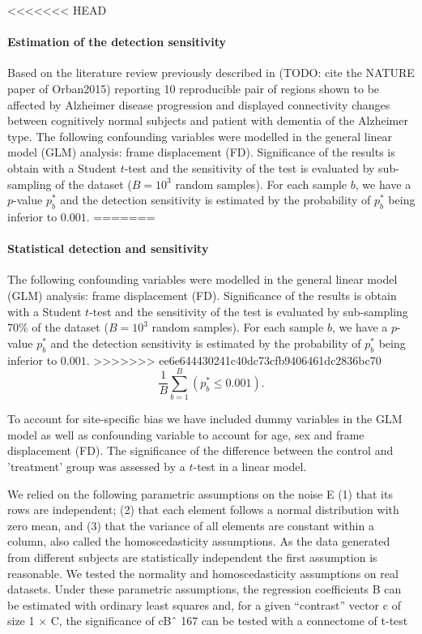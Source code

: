\documentclass[authoryear]{elsarticle}
\begin{document}
<<<<<<< HEAD
\paragraph{Estimation of the detection sensitivity}
Based on the literature review previously described in (TODO: cite the NATURE paper of Orban2015) reporting 10 reproducible pair of regions shown to be affected by Alzheimer disease progression and displayed connectivity changes between cognitively normal subjects and patient with dementia of the Alzheimer type. The following confounding variables were modelled in the general linear model (GLM) analysis: frame displacement (FD). Significance of the results is obtain with a Student $t$-test and the sensitivity of the test is evaluated by sub-sampling of the dataset ($B=10^3$ random samples). For each sample $b$, we have a $p$-value $p^{*}_b$ and the detection sensitivity is estimated by the probability of $p^{*}_b$ being inferior to $0.001$.
=======
\paragraph{Statistical detection  and sensitivity}
The following confounding variables were modelled in the general linear model (GLM) analysis: frame displacement (FD). Significance of the results is obtain with a Student $t$-test and the sensitivity of the test is evaluated by sub-sampling 70\% of the dataset ($B=10^3$ random samples). For each sample $b$, we have a $p$-value $p^{*}_b$ and the detection sensitivity is estimated by the probability of $p^{*}_b$ being inferior to $0.001$.
>>>>>>> ee6e644430241c40dc73cfb9406461dc2836bc70
\begin{equation}\label{Detection power}  
    \frac{1}{B}\sum\limits_{b=1}^B\left(p^{*}_b\leq0.001\right).
\end{equation}

To account for site-specific bias we have included dummy variables in the GLM model as well as confounding variable to account for age, sex and frame displacement (FD). The significance of the difference between the control and 'treatment' group was assessed by a $t$-test in a linear model.


We relied on the following parametric assumptions on the noise E (1) that its rows are independent; (2) that each element follows a normal distribution with zero mean, and (3) that the variance of all elements are constant within a column, also called the homoscedasticity assumptions. As the data generated from different subjects are statistically independent the first assumption is reasonable. We tested the normality and homoscedasticity assumptions on real datasets. Under these parametric assumptions, the regression coefficients B can be estimated with ordinary least squares and, for a given “contrast” vector c of size 1 × C, the significance of cBˆ 167 can be tested with a connectome of t-test
\end{document}
